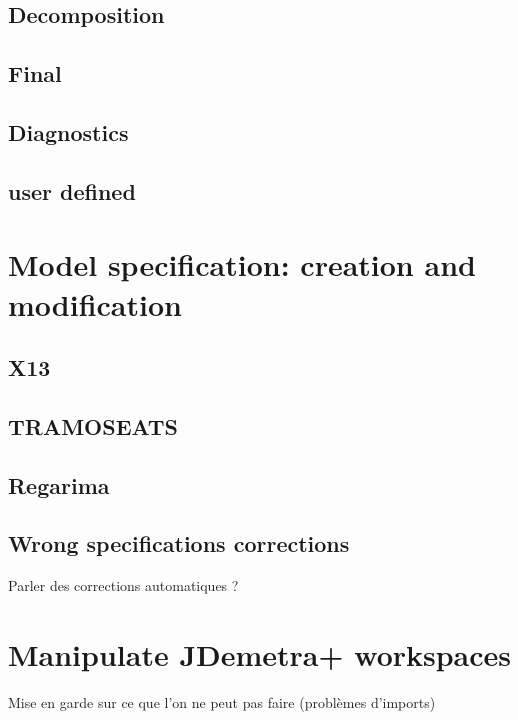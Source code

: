 \documentclass[article]{jss}
\begin{document}
\hypertarget{decomposition}{%
\subsection{Decomposition}\label{decomposition}}

\hypertarget{final}{%
\subsection{Final}\label{final}}

\hypertarget{diagnostics}{%
\subsection{Diagnostics}\label{diagnostics}}

\hypertarget{user-defined}{%
\subsection{user defined}\label{user-defined}}

\hypertarget{model-specification-creation-and-modification}{%
\section{Model specification: creation and
modification}\label{model-specification-creation-and-modification}}

\hypertarget{x13}{%
\subsection{X13}\label{x13}}

\hypertarget{tramoseats}{%
\subsection{TRAMOSEATS}\label{tramoseats}}

\hypertarget{regarima-1}{%
\subsection{Regarima}\label{regarima-1}}

\hypertarget{wrong-specifications-corrections}{%
\subsection{Wrong specifications
corrections}\label{wrong-specifications-corrections}}

Parler des corrections automatiques ?

\hypertarget{manipulate-jdemetra-workspaces}{%
\section{Manipulate JDemetra+
workspaces}\label{manipulate-jdemetra-workspaces}}

Mise en garde sur ce que l'on ne peut pas faire (problèmes d'imports)
\end{document}
